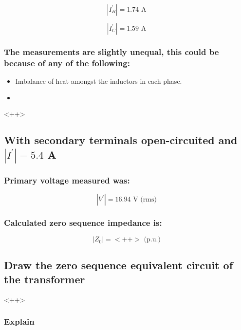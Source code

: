 \documentclass{article}
\begin{document}
\begin{equation}
  | I^{'}_{B} | = 1.74 \text{ A}
\end{equation}

\begin{equation}
  | I^{'}_{C} | = 1.59 \text{ A}
\end{equation}

\subsubsection{The measurements are slightly unequal, this could be because of any of the following:} 

\begin{itemize}
  \item Imbalance of heat amongst the inductors in each phase.
  \item 
\end{itemize}

<++>

\subsection{With secondary terminals open-circuited and $|I^{'}| = 5.4$ A} 

\subsubsection{Primary voltage measured was:}
\begin{equation}
  | V^{'} | = 16.94 \text{ V (rms)}
\end{equation}

\subsubsection{Calculated zero sequence impedance is:} 

\begin{equation}
  | Z_0 | = <++> \text{ (p.u.)}
\end{equation}

\subsection{Draw the zero sequence equivalent circuit of the transformer} 

<++>

\subsubsection{Explain} 
\end{document}
